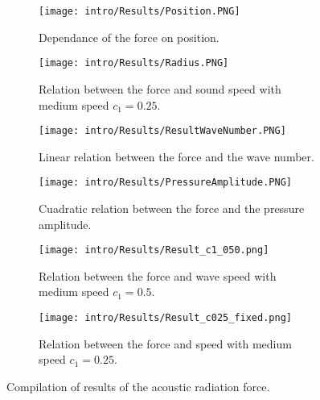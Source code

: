 \begin{figure*}
    \begin{subfigure}{0.4\textwidth}
    \centering
    \texttt{[image: intro/Results/Position.PNG]}
    \caption{Dependance of the force on position.}
    \label{fig:position}
    \end{subfigure}
    \begin{subfigure}{0.35\textwidth}
    \centering
    \texttt{[image: intro/Results/Radius.PNG]}
    \caption{Relation between the force and sound speed with medium speed $c_1=0.25$.}
    \label{fig:radius}
    \end{subfigure}
    \begin{subfigure}{0.4\textwidth}
    \centering
    \texttt{[image: intro/Results/ResultWaveNumber.PNG]}
    \caption{Linear relation between the force and the wave number.}
    \label{fig:wavenumber}
    \end{subfigure}
    \begin{subfigure}{0.35\textwidth}
    \centering
    \texttt{[image: intro/Results/PressureAmplitude.PNG]}
    \caption{Cuadratic relation between the force and the pressure amplitude.}
    \label{fig:amplitude}
    \end{subfigure}
    \begin{subfigure}{0.4\textwidth}
    \centering
    \texttt{[image: intro/Results/Result\_c1\_050.png]}
    \caption{Relation between the force and wave speed with medium speed $c_1 = 0.5$.}
    \label{fig:wavenumber}
    \end{subfigure}
    \begin{subfigure}{0.4\textwidth}
    \centering
    \texttt{[image: intro/Results/Result\_c025\_fixed.png]}
    \caption{Relation between the force and speed with medium speed $c_1 = 0.25$.}
    \label{fig:amplitude}
    \end{subfigure}
    \caption{Compilation of results of the acoustic radiation force.}
    \label{fig:ARF_results}
\end{figure*}

